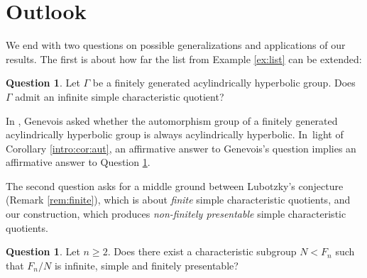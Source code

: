 \documentclass[11pt]{article}
\theoremstyle{definition}
\newtheorem{question}[theorem]{Question}
\begin{document}
\section{Outlook}

We end with two questions on possible generalizations and applications of our results. The first is about how far the list from Example \ref{ex:list} can be extended:

\begin{question}
\label{q:genevois}
Let $\Gamma$ be a finitely generated acylindrically hyperbolic group. Does~$\Gamma$ admit an infinite simple characteristic quotient?
\end{question}

In \cite[Quest.\,1.1]{auto:oneend}, Genevois asked whether the automorphism group of a finitely generated acylindrically hyperbolic group is always acylindrically hyperbolic. In~light of Corollary \ref{intro:cor:aut}, an affirmative answer to Genevois's question implies an affirmative answer to Question \ref{q:genevois}.

The second question asks for a middle ground between Lubotzky's conjecture (Remark \ref{rem:finite}), which is about \emph{finite} simple characteristic quotients, and our construction, which produces \emph{non-finitely presentable} simple characteristic quotients.

\begin{question}
Let $n \geq 2$. Does there exist a characteristic subgroup $N < F_n$ such that $F_n / N$ is infinite, simple and finitely presentable?
\end{question}

\end{document}
